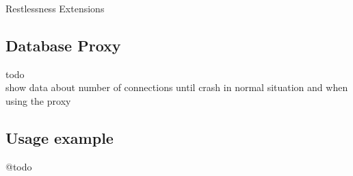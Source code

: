 \begin{chapter}{Restlessness Extensions}
    \subsection{Database Proxy}
    \label{subsec:database_proxy}
    todo\\
    show data about number of connections until crash in normal
    situation and when using the proxy

    \subsection{Usage example}
    @todo

\end{chapter}